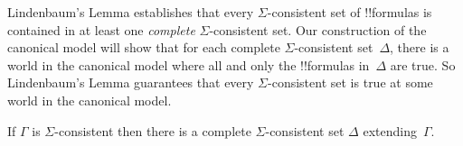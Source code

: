 \documentclass[../../../include/open-logic-section]{subfiles}
\begin{document}


Lindenbaum's Lemma establishes that every $\Sigma$-consistent set of
!!{formula}s is contained in at least one \emph{complete}
$\Sigma$-consistent set. Our construction of the canonical model will
show that for each complete $\Sigma$-consistent set~$\Delta$, there is
a world in the canonical model where all and only the !!{formula}s
in~$\Delta$ are true. So Lindenbaum's Lemma guarantees that every
$\Sigma$-consistent set is true at some world in the canonical model.

\begin{thm}
  If $\Gamma$ is $\Sigma$-consistent then there is a complete
  $\Sigma$-consistent set $\Delta$ extending~$\Gamma$.
\end{thm}
\end{document}
